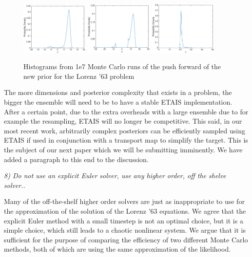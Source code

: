 \documentclass{article}
\newcommand{\comment}[2]{\vspace{0.6cm}{\bf Comment:} {\it #1.}

\vspace{0.3cm}{\bf Answer:} #2}
\begin{document}
{\begin{figure}[htp]
\includegraphics[width=0.3\textwidth]{figures/xhist}
\includegraphics[width=0.3\textwidth]{figures/yhist}
\includegraphics[width=0.3\textwidth]{figures/zhist}
\caption{Histograms from 1e7 Monte Carlo runs of the push forward of the new prior for the Lorenz '63 problem}
\end{figure}

The more dimensions and posterior complexity that exists in a problem, the bigger the ensemble will need to be to have a stable ETAIS implementation. After a certain point, due to the extra overheads with a large ensemble due to for example the resampling, ETAIS will no longer be competitive. This said, in our most recent work, arbitrarily complex posteriors can be efficiently sampled using ETAIS if used in conjunction with a transport map to simplify the target. This is the subject of our next paper which we will be submitting imminently. We have added a paragraph to this end to the discussion.}


  \comment{8) Do not use an explicit Euler solver, use any higher order, off the shelve solver.}{Many of the off-the-shelf higher order solvers are just as inappropriate to use for the approximation of the solution of the Lorenz '63 equations. We agree that the explicit Euler method with a small timestep is not an optimal choice, but it is a simple choice, which still leads to a chaotic nonlinear system. We argue that it is sufficient for the purpose of comparing the efficiency of two different Monte Carlo methods, both of which are using the same approximation of the likelihood.}

\end{document}
